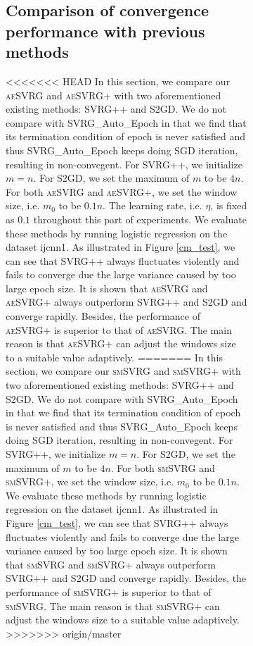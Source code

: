 \documentclass[conference]{IEEEtran}
\begin{document}
\begin{algorithm}[t]
\begin{itemize}
\begin{figure}[ht]
\begin{figure}[ht]
\subsection{Comparison of convergence performance with previous methods}
<<<<<<< HEAD
In this section, we compare our \textsc{aeSVRG} and \textsc{aeSVRG+} with two aforementioned existing methods: SVRG++ and S2GD. We do not compare with SVRG\_Auto\_Epoch in that we find that its termination condition of epoch is never satisfied and  thus SVRG\_Auto\_Epoch keeps doing SGD iteration, resulting in non-convegent. For SVRG++, we initialize $m = n$. For S2GD, we set the maximum of $m$ to be $4n$. For both \textsc{aeSVRG} and \textsc{aeSVRG+}, we set the window size, i.e. $m_0$ to be $0.1n$. The learning rate, i.e. $\eta$, is fixed as $0.1$ throughout this part of experiments. We evaluate these methods by running logistic regression on the dataset ijcnn1. 
As illustrated in Figure \ref{cm_test}, we can see that SVRG++ always fluctuates violently and fails to converge due the large variance caused by too large epoch size. It is shown that \textsc{aeSVRG} and \textsc{aeSVRG+} always outperform SVRG++ and S2GD and converge rapidly. Besides, the performance of \textsc{aeSVRG+} is superior to that of \textsc{aeSVRG}. The main reason is that \textsc{aeSVRG+} can adjust the windows size to a suitable value adaptively.
=======
In this section, we compare our \textsc{smSVRG} and \textsc{smSVRG+} with two aforementioned existing methods: SVRG++ and S2GD. We do not compare with SVRG\_Auto\_Epoch in that we find that its termination condition of epoch is never satisfied and  thus SVRG\_Auto\_Epoch keeps doing SGD iteration, resulting in non-convegent. For SVRG++, we initialize $m = n$. For S2GD, we set the maximum of $m$ to be $4n$. For both \textsc{smSVRG} and \textsc{smSVRG+}, we set the window size, i.e. $m_0$ to be $0.1n$. We evaluate these methods by running logistic regression on the dataset ijcnn1. 
As illustrated in Figure \ref{cm_test}, we can see that SVRG++ always fluctuates violently and fails to converge due the large variance caused by too large epoch size. It is shown that \textsc{smSVRG} and \textsc{smSVRG+} always outperform SVRG++ and S2GD and converge rapidly. Besides, the performance of \textsc{smSVRG+} is superior to that of \textsc{smSVRG}. The main reason is that \textsc{smSVRG+} can adjust the windows size to a suitable value adaptively.
>>>>>>> origin/master




\end{figure}
\end{figure}
\end{itemize}
\end{algorithm}
\end{document}
